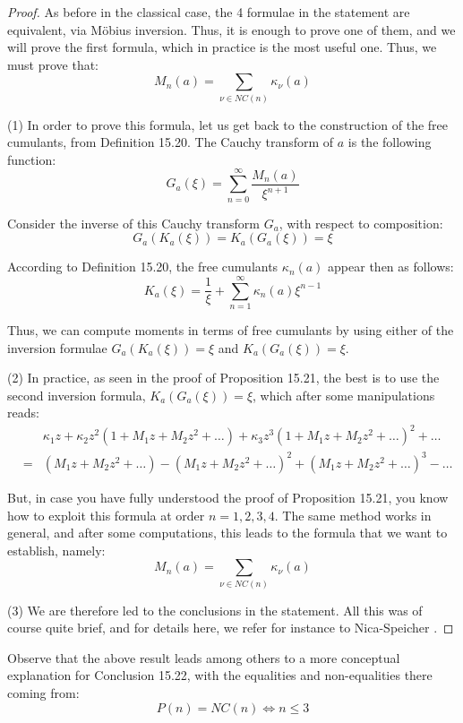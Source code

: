 \documentclass[12pt]{amsbook}
\begin{document}
\begin{proof}
As before in the classical case, the 4 formulae in the statement are equivalent, via M\"obius inversion. Thus, it is enough to prove one of them, and we will prove the first formula, which in practice is the most useful one. Thus, we must prove that:
$$M_n(a)=\sum_{\nu\in NC(n)}\kappa_\nu(a)$$

(1) In order to prove this formula, let us get back to the construction of the free cumulants, from Definition 15.20. The Cauchy transform of $a$ is the following function:
$$G_a(\xi)=\sum_{n=0}^\infty\frac{M_n(a)}{\xi^{n+1}}$$

Consider the inverse of this Cauchy transform $G_a$, with respect to composition:
$$G_a(K_a(\xi))=K_a(G_a(\xi))=\xi$$

According to Definition 15.20, the free cumulants $\kappa_n(a)$ appear then as follows:
$$K_a(\xi)=\frac{1}{\xi}+\sum_{n=1}^\infty\kappa_n(a)\xi^{n-1}$$

Thus, we can compute moments in terms of free cumulants by using either of the inversion formulae $G_a(K_a(\xi))=\xi$ and $K_a(G_a(\xi))=\xi$. 

\medskip

(2) In practice, as seen in the proof of Proposition 15.21, the best is to use the second inversion formula, $K_a(G_a(\xi))=\xi$, which after some manipulations reads:
\begin{eqnarray*}
&&\kappa_1z+\kappa_2z^2(1+M_1z+M_2z^2+\ldots)+\kappa_3z^3(1+M_1z+M_2z^2+\ldots)^2+\ldots\\
&=&(M_1z+M_2z^2+\ldots)-(M_1z+M_2z^2+\ldots)^2+(M_1z+M_2z^2+\ldots)^3-\ldots
\end{eqnarray*}

But, in case you have fully understood the proof of Proposition 15.21, you know how to exploit this formula at order $n=1,2,3,4$. The same method works in general, and after some computations, this leads to the formula that we want to establish, namely:
$$M_n(a)=\sum_{\nu\in NC(n)}\kappa_\nu(a)$$

(3) We are therefore led to the conclusions in the statement. All this was of course quite brief, and for details here, we refer for instance to Nica-Speicher \cite{nsp}.
\end{proof}

Observe that the above result leads among others to a more conceptual explanation for Conclusion 15.22, with the equalities and non-equalities there coming from:
$$P(n)=NC(n)\iff n\leq3$$
\end{document}
